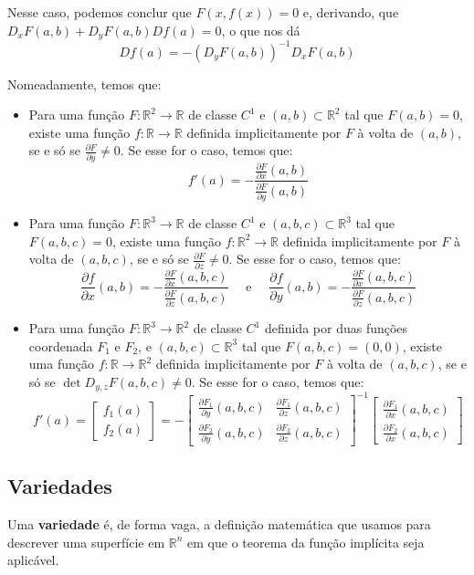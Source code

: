 \documentclass{article}
\newcommand{\R}{\mathbb{R}}
\begin{document}
Nesse caso, podemos conclur que $F(x, f(x)) = 0$ e, derivando, que $D_xF(a,b) + D_yF(a,b)Df(a) = 0$, o que nos dá
$$ Df(a) = - (D_yF(a,b))^{-1} D_xF(a,b) $$

Nomeadamente, temos que:
\begin{itemize}
    \item Para uma função $F:\R^2 \to \R$ de classe $C^1$ e $(a,b) \subset \R^2$ tal que $F(a,b)=0$, existe uma função $f: \R \to \R$ definida implicitamente por $F$ à volta de $(a,b)$, se e só se $\frac{\partial F}{\partial y} \neq 0$. Se esse for o caso, temos que:
$$
f'(a) = -\frac{\frac{\partial F}{\partial x}(a,b)}{\frac{\partial F}{\partial y}(a,b)}
$$
    \item Para uma função $F:\R^3 \to \R$ de classe $C^1$ e $(a,b,c) \subset \R^3$ tal que $F(a,b,c)=0$, existe uma função $f: \R^2 \to \R$ definida implicitamente por $F$ à volta de $(a,b,c)$, se e só se $\frac{\partial F}{\partial z} \neq 0$. Se esse for o caso, temos que:
$$
\frac{\partial f}{\partial x}(a,b) = -\frac{\frac{\partial F}{\partial x}(a,b,c)}{\frac{\partial F}{\partial z}(a,b,c)} \quad \text{ e } 
\quad \frac{\partial f}{\partial y}(a,b) = -\frac{\frac{\partial F}{\partial x}(a,b,c)}{\frac{\partial F}{\partial z}(a,b,c)}
$$
    \item Para uma função $F:\R^3 \to \R^2$ de classe $C^1$ definida por duas funções coordenada $F_1$ e $F_2$, e $(a,b,c) \subset \R^3$ tal que $F(a,b,c)=(0,0)$, existe uma função $f: \R \to \R^2$ definida implicitamente por $F$ à volta de $(a,b,c)$, se e só se $\det D_{y,z}F(a,b,c) \neq 0$. Se esse for o caso, temos que:
$$
f'(a) = \begin{bmatrix} f_1(a) \\ f_2(a) \end{bmatrix} 
= - \begin{bmatrix} 
\frac{\partial F_1}{\partial y}(a,b,c) & \frac{\partial F_1}{\partial z}(a,b,c) \\
\frac{\partial F_2}{\partial y}(a,b,c) & \frac{\partial F_2}{\partial z}(a,b,c) 
\end{bmatrix}^{-1} \begin{bmatrix} \frac{\partial F_1}{\partial x}(a,b,c) \\
\frac{\partial F_2}{\partial x}(a,b,c) \end{bmatrix}
$$
\end{itemize}

\subsection{Variedades}
Uma \textbf{variedade} é, de forma vaga, a definição matemática que usamos para descrever uma superfície em $\R^n$ em que o teorema da função implícita seja aplicável. 
\end{document}
